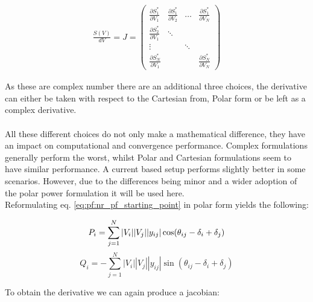 \begin{align}
    \frac{S(V)}{dV} = J = 
    \begin{pmatrix}
        \frac{\partial S^*_1}{\partial V_1} & \frac{\partial S^*_1}{\partial V_2} & \dots  & \frac{\partial S^*_1}{\partial V_N}\\
        \frac{\partial S^*_2}{\partial V_1} & \ddots                              &        &                                    \\
        \vdots                              &                                     & \ddots &                                    \\
        \frac{\partial S^*_N}{\partial V_1} &                                     &        & \frac{\partial S^*_N}{\partial V_N}
    \end{pmatrix}
\end{align}

As these are complex number there are an additional three choices, the derivative can either be taken
with respect to the Cartesian from, Polar form or be left as a complex derivative.\\
\\
All these different choices do not only make a mathematical difference, they have an impact
on computational and convergence performance\autocite{newton_raphson_setup_choices}. Complex formulations
generally perform the worst, whilst Polar and Cartesian formulations seem to have similar performance.
A current based setup performs slightly better in some scenarios\autocite{newton_raphson_setup_choices}.
However, due to the differences being minor and a wider adoption of the polar power formulation it will be used
here.\\

Reformulating eq. \ref{eq:pf:nr_pf_starting_point} in polar form yields the following:

\begin{equation}
    P_i = \sum_{j=1}^N |V_i||V_j||y_{ij}| \cos(\theta_{ij} - \delta_i + \delta_j)\\
    \label{eq:pf:nr_pf_p}
\end{equation}
\begin{equation}
    Q_i = -\sum_{j=1}^N |V_i||V_j||y_{ij}| \sin(\theta_{ij} - \delta_i + \delta_j)
    \label{eq:pf:nr_pf_q}
\end{equation}

To obtain the derivative we can again produce a jacobian:

